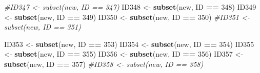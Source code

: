 \documentclass[
]{book}
\newenvironment{Shaded}{\begin{snugshade}}{\end{snugshade}}
\newcommand{\CommentTok}[1]{\textcolor[rgb]{0.56,0.35,0.01}{\textit{#1}}}
\newcommand{\DecValTok}[1]{\textcolor[rgb]{0.00,0.00,0.81}{#1}}
\newcommand{\KeywordTok}[1]{\textcolor[rgb]{0.13,0.29,0.53}{\textbf{#1}}}
\newcommand{\NormalTok}[1]{#1}
\newcommand{\OperatorTok}[1]{\textcolor[rgb]{0.81,0.36,0.00}{\textbf{#1}}}
\newcommand{\StringTok}[1]{\textcolor[rgb]{0.31,0.60,0.02}{#1}}
\begin{document}
\begin{Shaded}
\begin{Highlighting}[]
{{{{{{\CommentTok{#ID347 <- subset(new, ID == 347)}
\NormalTok{ID348 <-}\StringTok{ }\KeywordTok{subset}\NormalTok{(new, ID }\OperatorTok{==}\StringTok{ }\DecValTok{348}\NormalTok{)}
\NormalTok{ID349 <-}\StringTok{ }\KeywordTok{subset}\NormalTok{(new, ID }\OperatorTok{==}\StringTok{ }\DecValTok{349}\NormalTok{)}
\NormalTok{ID350 <-}\StringTok{ }\KeywordTok{subset}\NormalTok{(new, ID }\OperatorTok{==}\StringTok{ }\DecValTok{350}\NormalTok{)}
\CommentTok{#ID351 <- subset(new, ID == 351)}

\NormalTok{ID353 <-}\StringTok{ }\KeywordTok{subset}\NormalTok{(new, ID }\OperatorTok{==}\StringTok{ }\DecValTok{353}\NormalTok{)}
\NormalTok{ID354 <-}\StringTok{ }\KeywordTok{subset}\NormalTok{(new, ID }\OperatorTok{==}\StringTok{ }\DecValTok{354}\NormalTok{)}
\NormalTok{ID355 <-}\StringTok{ }\KeywordTok{subset}\NormalTok{(new, ID }\OperatorTok{==}\StringTok{ }\DecValTok{355}\NormalTok{)}
\NormalTok{ID356 <-}\StringTok{ }\KeywordTok{subset}\NormalTok{(new, ID }\OperatorTok{==}\StringTok{ }\DecValTok{356}\NormalTok{)}
\NormalTok{ID357 <-}\StringTok{ }\KeywordTok{subset}\NormalTok{(new, ID }\OperatorTok{==}\StringTok{ }\DecValTok{357}\NormalTok{)}
\CommentTok{#ID358 <- subset(new, ID == 358)}

}}}}}}
\end{Highlighting}
\end{Shaded}
\end{document}
